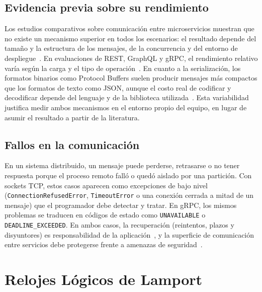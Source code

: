 \documentclass[12pt,a4paper]{article}
\begin{document}
\subsection{Evidencia previa sobre su rendimiento}

Los estudios comparativos sobre comunicación entre microservicios muestran que no existe un mecanismo superior en todos los escenarios: el resultado depende del tamaño y la estructura de los mensajes, de la concurrencia y del entorno de despliegue~\cite{ciftci2025review}. En evaluaciones de REST, GraphQL y gRPC, el rendimiento relativo varía según la carga y el tipo de operación~\cite{niswar2024performance}. En cuanto a la serialización, los formatos binarios como Protocol Buffers suelen producir mensajes más compactos que los formatos de texto como JSON, aunque el costo real de codificar y decodificar depende del lenguaje y de la biblioteca utilizada~\cite{jackson2024streaming,mehdi2026crosslanguage}. Esta variabilidad justifica medir ambos mecanismos en el entorno propio del equipo, en lugar de asumir el resultado a partir de la literatura.

\subsection{Fallos en la comunicación}

En un sistema distribuido, un mensaje puede perderse, retrasarse o no tener respuesta porque el proceso remoto falló o quedó aislado por una partición. Con sockets TCP, estos casos aparecen como excepciones de bajo nivel (\texttt{ConnectionRefusedError}, \texttt{TimeoutError} o una conexión cerrada a mitad de un mensaje) que el programador debe detectar y tratar. En gRPC, los mismos problemas se traducen en códigos de estado como \texttt{UNAVAILABLE} o \texttt{DEADLINE\_EXCEEDED}. En ambos casos, la recuperación (reintentos, plazos y disyuntores) es responsabilidad de la aplicación~\cite{mohammad2025resilient}, y la superficie de comunicación entre servicios debe protegerse frente a amenazas de seguridad~\cite{haindl2024security}.

\section{Relojes Lógicos de Lamport}
\label{sec:fundamento_lamport}
\end{document}
